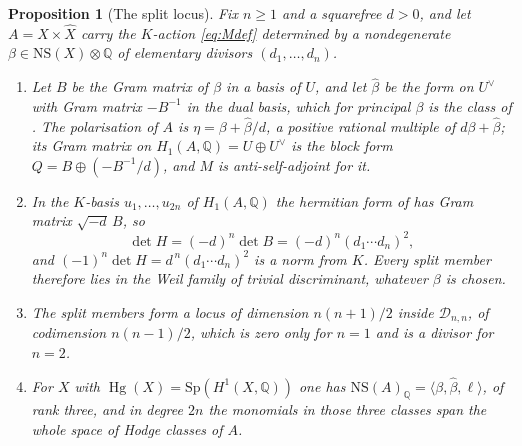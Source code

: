 \documentclass[11pt,reqno]{amsart}
\theoremstyle{plain}
\newtheorem{proposition}[theorem]{Proposition}
\theoremstyle{definition}
\theoremstyle{remark}
\newcommand{\QQ}{\mathbb{Q}}
\newcommand{\cD}{\mathcal{D}}
\newcommand{\NS}{\mathrm{NS}}
\DeclareMathOperator{\Hg}{Hg}
\begin{document}
\begin{proposition}[The split locus]\label{prop:splitgeom}
Fix $n\ge1$ and a squarefree $d>0$, and let $A=X\times\widehat{X}$ carry the
$K$-action \eqref{eq:Mdef} determined by a nondegenerate
$\beta\in\NS(X)\otimes\QQ$ of elementary divisors $(d_{1},\dots,d_{n})$.
\begin{enumerate}[label=\textup{(\roman*)},nosep]
\item Let $B$ be the Gram matrix of $\beta$ in a basis of $U$, and let
  $\widehat\beta$ be the form on $U^{\vee}$ with Gram matrix $-B^{-1}$ in the
  dual basis, which for principal $\beta$ is the class of
  . The polarisation of $A$ is
  $\eta=\beta+\widehat{\beta}/d$, a positive rational multiple of
  $d\beta+\widehat\beta$; its Gram matrix on $H_{1}(A,\QQ)=U\oplus U^{\vee}$
  is the block form $Q=B\oplus(-B^{-1}/d)$, and $M$ is anti-self-adjoint for
  it.
\item In the $K$-basis $u_{1},\dots,u_{2n}$ of $H_{1}(A,\QQ)$ the hermitian
  form of  has Gram matrix $\sqrt{-d}\,B$, so
  \[
    \det H=(-d)^{n}\det B=(-d)^{n}(d_{1}\cdots d_{n})^{2},
  \]
  and $(-1)^{n}\det H=d^{\,n}(d_{1}\cdots d_{n})^{2}$ is a norm from $K$.
  Every split member therefore lies in the Weil family of trivial
  discriminant, whatever $\beta$ is chosen.
\item The split members form a locus of dimension $n(n+1)/2$ inside
  $\cD_{n,n}$, of codimension $n(n-1)/2$, which is zero only for $n=1$ and is
  a divisor for $n=2$.
\item For $X$ with $\Hg(X)=\mathrm{Sp}(H^{1}(X,\QQ))$ one has
  $\NS(A)_{\QQ}=\langle\beta,\widehat{\beta},\ell\rangle$, of rank three, and
  in degree $2n$ the monomials in those three classes span the whole space of
  Hodge classes of $A$.
\end{enumerate}
\end{proposition}
\end{document}
